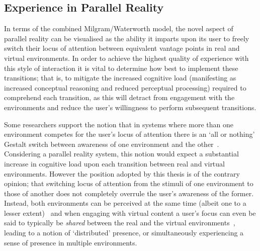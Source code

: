 


\subsection{Experience in Parallel Reality}

\label{transitions_in_parallel_reality}

In terms of the combined Milgram/Waterworth model, the novel aspect of parallel reality can be visualised as the ability it imparts upon its user to freely switch their locus of attention between equivalent vantage points in real and virtual environments. In order to achieve the highest quality of experience with this style of interaction it is vital to determine how best to implement these transitions; that is, to mitigate the increased cognitive load (manifesting as increased conceptual reasoning and reduced perceptual processing) required to comprehend each transition, as this will detract from engagement with the environments and reduce the user's willingness to perform subsequent transitions.



Some researchers support the notion that in systems where more than one environment competes for the user's locus of attention there is an `all or nothing' Gestalt switch between awareness of one environment and the other~\cite{Slater2002}. Considering a parallel reality system, this notion would expect a substantial increase in cognitive load upon each transition between real and virtual environments. However the position adopted by this thesis is of the contrary opinion; that switching locus of attention from the stimuli of one environment to those of another does not completely overrule the user's awareness of the former. Instead, both environments can be perceived at the same time (albeit one to a lesser extent)~\cite{Ijsselsteijn2001} and when engaging with virtual content a user's focus can even be said to typically be \textit{shared} between the real and the virtual environments~\cite{Waterworth2001}, leading to a notion of `distributed' presence, or simultaneously experiencing a sense of presence in multiple environments.

